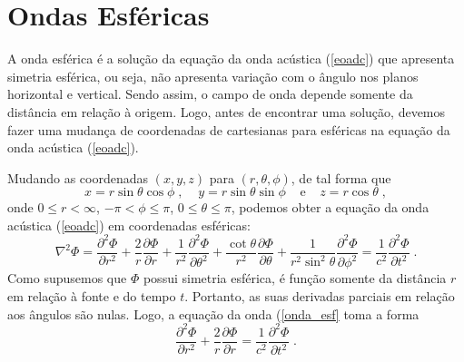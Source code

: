 \section{Ondas Esf\'ericas}
\label{esf}

A onda esf\'erica \'e a solu\c{c}\~ao da equa\c{c}\~ao da onda
ac\'ustica (\ref{eoadc}) que apresenta simetria esf\'erica, ou seja,
n\~ao apresenta varia\c{c}\~ao com o \^angulo nos planos horizontal e
vertical. Sendo assim, o campo de onda depende somente da dist\^ancia em
rela\c{c}\~ao \`a origem. Logo, antes de encontrar uma solu\c{c}\~ao,
devemos fazer uma mudan\c{c}a de coordenadas de cartesianas para
esf\'ericas na equa\c{c}\~ao da onda ac\'ustica (\ref{eoadc}).

Mudando as coordenadas $(x,y,z)$ para $(r,\theta,\phi)$, de tal forma
que
$$
x=r\sin{\theta}\cos{\phi}\;, \;\;\;\; y=r\sin{\theta}\sin{\phi}
\;\;\;\;\mathrm{e}\;\;\;\; z=r\cos{\theta} \;,
$$
onde $0 \leq r <\infty $, $-\pi < \phi \leq \pi $,
$0 \leq \theta \leq \pi $, podemos obter a
equa\c{c}\~ao da onda ac\'ustica (\ref{eoadc}) em coordenadas esf\'ericas:
\begin{equation}
\nabla^2 \Phi = \frac{\partial^2 \Phi}{\partial r^2} +
\frac{2}r{}\frac{\partial \Phi}{\partial r} +
\frac{1}{r^2}\frac{\partial^2 \Phi}{\partial \theta^2} +
\frac{\cot{\theta}}{r^2}\frac{\partial \Phi}{\partial \theta} +
\frac{1}{r^2 \sin^2{\theta}}\frac{\partial^2 \Phi}{\partial
\phi^2} = \frac{1}{c^2}\frac{\partial^2 \Phi}{\partial t^2} \;.
\label{onda_esf}
\end{equation}
Como supusemos que $\Phi$ possui simetria esf\'erica, \'e fun\c{c}\~ao
somente da dist\^ancia $r$ em rela\c{c}\~ao \`a fonte e do tempo $t$.
Portanto, as suas derivadas parciais em rela\c{c}\~ao aos \^angulos
s\~ao nulas. Logo, a equa\c{c}\~ao da onda (\ref{onda_esf} toma a forma
\begin{equation}
\frac{\partial^2 \Phi}{\partial r^2} + \frac{2}{r}\frac{\partial
\Phi}{\partial r} = \frac{1}{c^2}\frac{\partial^2 \Phi}{\partial
t^2} \;.
\label{onda_esf_menor}
\end{equation}


